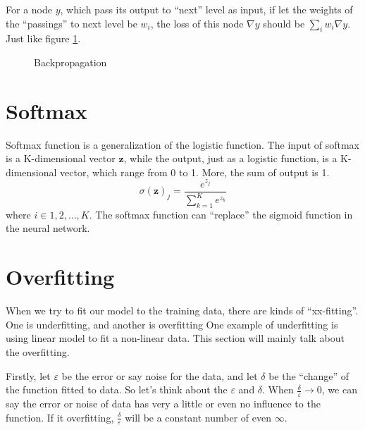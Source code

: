 \documentclass[twoside]{article}
\begin{document}
For a node $y$, which pass its output to ``next'' level as input,
if let the weights of the ``passings'' to next level be $w_i$, the 
loss of this node $\nabla y$ should be $\sum\limits_{i}w_i\nabla y$.
Just like figure \ref{fig:bp:1}.

\begin{figure}
    \centering
    \caption{Backpropagation}
    \label{fig:bp:1}
\end{figure}


\section{Softmax}
\label{sec:softmax}

Softmax function is a generalization of the logistic function.
The input of softmax is a K-dimensional vector $\mathbf{z}$,
while the output, just as a logistic function, is a K-dimensional vector,
which range from 0 to 1. More, the sum of output is 1.
\begin{equation}
\sigma(\mathbf{z})_j = \frac{e^{z_j}}{\sum_{k=1}^{K}e^{z_k}}
\end{equation}
where $i \in 1,2,\dots,K$.
The softmax function can ``replace'' the sigmoid function in the neural network.


\section{Overfitting}
\label{sec:of}

When we try to fit our model to the training data, there are kinds of ``xx-fitting''. One is underfitting, and another is overfitting
One example of underfitting  is using linear model to fit a non-linear data.
This section will mainly talk about the overfitting. 

Firstly, let $\varepsilon$ be the error or say noise for the data, and let $\delta$ be the ``change'' of the function fitted to data.
So let's think about the $\varepsilon$ and $\delta$. When $\frac{\delta}{\varepsilon} \rightarrow 0$, we can say the error or noise of data has
very a little or even no influence to the function. If it overfitting, $\frac{\delta}{\varepsilon}$ will be a constant number of even $\infty$.
\end{document}
